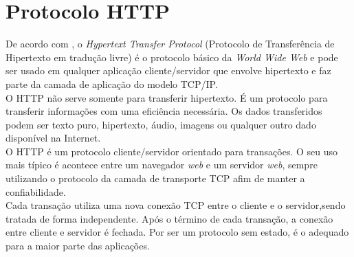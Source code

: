\section{Protocolo HTTP}
De acordo com , o \textit{Hypertext Transfer 
Protocol} (Protocolo de Transferência de Hipertexto em tradução livre) é o 
protocolo básico da \textit{World Wide Web} e pode ser usado em qualquer 
aplicação cliente/servidor que envolve hipertexto e faz parte da camada de 
aplicação do modelo TCP/IP.\\
O HTTP não serve somente para transferir hipertexto. É um protocolo para transferir informações com uma eficiência necessária. Os dados transferidos podem ser texto puro, hipertexto, áudio, imagens ou qualquer outro dado disponível na Internet.\\
O HTTP é um protocolo cliente/servidor orientado para transações. O seu uso 
mais típico é acontece entre um navegador \textit{web} e um servidor 
\textit{web}, sempre utilizando o protocolo da camada de transporte TCP afim de 
manter a confiabilidade.\\
Cada transação utiliza uma nova conexão TCP entre o cliente e o servidor,sendo 
tratada de forma independente. Após o término de cada transação, a conexão 
entre cliente e servidor é fechada. Por ser um protocolo sem estado, é o 
adequado para a maior parte das aplicações.\\
